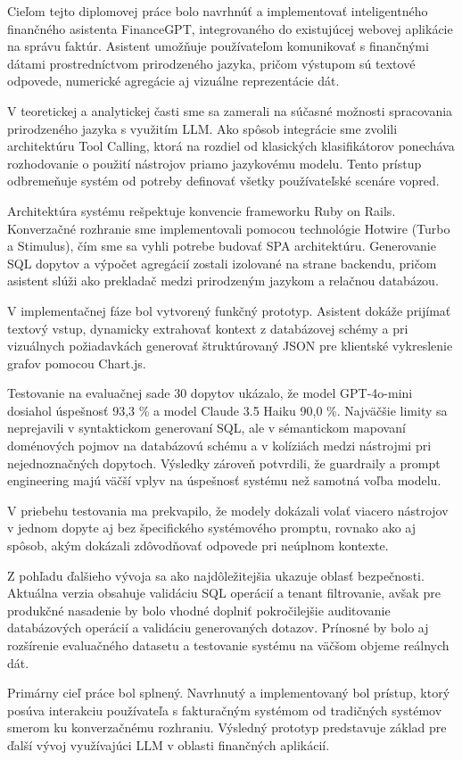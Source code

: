 Cieľom tejto diplomovej práce bolo navrhnúť a implementovať inteligentného
finančného asistenta FinanceGPT, integrovaného do existujúcej webovej aplikácie na
správu faktúr. Asistent umožňuje používateľom komunikovať s finančnými dátami
prostredníctvom prirodzeného jazyka, pričom výstupom sú textové odpovede,
numerické agregácie aj vizuálne reprezentácie dát.

V teoretickej a analytickej časti sme sa zamerali na súčasné možnosti
spracovania prirodzeného jazyka s využitím LLM. Ako spôsob integrácie sme zvolili
architektúru Tool Calling, ktorá na rozdiel od klasických klasifikátorov
ponecháva rozhodovanie o použití nástrojov priamo jazykovému modelu. Tento prístup
odbremeňuje systém od potreby definovať všetky používateľské scenáre vopred.

Architektúra systému rešpektuje konvencie frameworku Ruby on Rails. Konverzačné
rozhranie sme implementovali pomocou technológie Hotwire (Turbo a Stimulus), čím sme
sa vyhli potrebe budovať SPA architektúru. Generovanie SQL dopytov a výpočet
agregácií zostali izolované na strane backendu, pričom asistent slúži ako prekladač
medzi prirodzeným jazykom a relačnou databázou.

V implementačnej fáze bol vytvorený funkčný prototyp. Asistent dokáže prijímať
textový vstup, dynamicky extrahovať kontext z databázovej schémy a pri vizuálnych
požiadavkách generovať štruktúrovaný JSON pre klientské vykreslenie grafov pomocou
Chart.js.

Testovanie na evaluačnej sade 30 dopytov ukázalo, že model GPT-4o-mini dosiahol
úspešnosť 93,3 \% a model Claude 3.5 Haiku 90,0 \%. Najväčšie limity sa neprejavili
v syntaktickom generovaní SQL, ale v sémantickom mapovaní doménových pojmov na
databázovú schému a v kolíziách medzi nástrojmi pri nejednoznačných dopytoch. Výsledky
zároveň potvrdili, že guardraily a prompt engineering majú väčší vplyv na
úspešnosť systému než samotná voľba modelu.

V priebehu testovania ma prekvapilo, že modely dokázali volať viacero nástrojov v
jednom dopyte aj bez špecifického systémového promptu, rovnako ako aj spôsob, akým
dokázali zdôvodňovať odpovede pri neúplnom kontexte.

Z pohľadu ďalšieho vývoja sa ako najdôležitejšia ukazuje oblasť bezpečnosti.
Aktuálna verzia obsahuje validáciu SQL operácií a tenant filtrovanie, avšak pre produkčné
nasadenie by bolo vhodné doplniť pokročilejšie auditovanie databázových operácií a
validáciu generovaných dotazov. Prínosné by bolo aj rozšírenie evaluačného
datasetu a testovanie systému na väčšom objeme reálnych dát.

Primárny cieľ práce bol splnený. Navrhnutý a implementovaný bol prístup, ktorý
posúva interakciu používateľa s fakturačným systémom od tradičných systémov
smerom ku konverzačnému rozhraniu. Výsledný prototyp predstavuje základ pre ďalší
vývoj využívajúci LLM v oblasti finančných aplikácií.